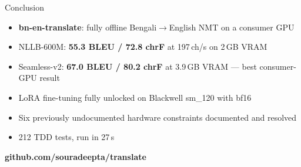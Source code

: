 \documentclass[aspectratio=169,10pt]{beamer}
\begin{document}
\begin{frame}{Conclusion}
  \begin{itemize}
    \item \textbf{bn-en-translate}: fully offline Bengali$\to$English NMT on a consumer GPU
    \item NLLB-600M: \textbf{55.3 BLEU / 72.8 chrF} at 197\,ch/s on 2\,GB VRAM
    \item Seamless-v2: \textbf{67.0 BLEU / 80.2 chrF} at 3.9\,GB VRAM --- best consumer-GPU result
    \item LoRA fine-tuning fully unlocked on Blackwell sm\_120 with bf16
    \item Six previously undocumented hardware constraints documented and resolved
    \item 212 TDD tests, run in 27\,s
  \end{itemize}
  \vspace{0.4cm}
  \begin{center}
    \large\textbf{github.com/souradeepta/translate}
  \end{center}
\end{frame}
\end{document}
